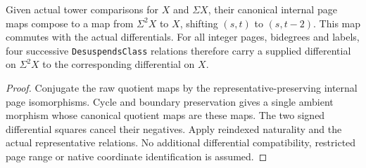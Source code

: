 \begin{lemma}
  \label{lem:adams-double-suspension-differential}
  \leanok
  Given actual tower comparisons for $X$ and $\Sigma X$, their canonical
  internal page maps compose to a map from $\Sigma^2X$ to $X$, shifting
  $(s,t)$ to $(s,t-2)$. This map commutes with the actual differentials.
  For all integer pages, bidegrees and labels, four successive
  \texttt{DesuspendsClass} relations therefore carry a supplied differential
  on $\Sigma^2X$ to the corresponding differential on $X$.
\end{lemma}
\begin{proof}
  \leanok
  Conjugate the raw quotient maps by the representative-preserving internal
  page isomorphisms. Cycle and boundary preservation gives a single ambient
  morphism whose canonical quotient maps are these maps. The two signed
  differential squares cancel their negatives. Apply reindexed naturality
  and the actual representative relations. No additional differential
  compatibility, restricted page range or native coordinate identification
  is assumed.
\end{proof}

